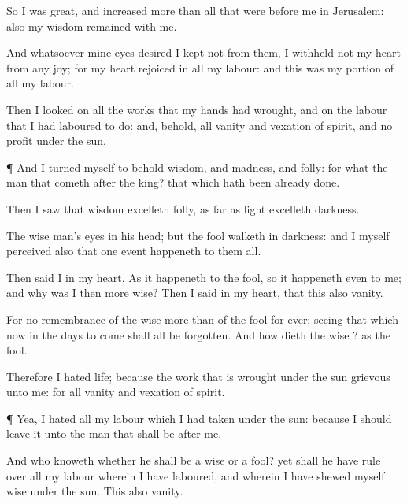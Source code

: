 {So I was
great, and
increased more than all that were
before me in
Jerusalem: also my
wisdom
remained with me.

And whatsoever mine
eyes
desired I
kept not from them, I
withheld not my
heart from any
joy; for my
heart
rejoiced in all my
labour: and this was my
portion of all my
labour.

Then I
looked on all the
works that my
hands had
wrought, and on the
labour that I had
laboured to
do: and, behold, all
{}
vanity and
vexation of
spirit, and
{} no
profit under the
sun.


\par }{\PP {}¶ And I
turned myself to
behold
wisdom, and
madness, and
folly: for what
{} the
man
{} that
cometh
after the
king?
{} that which hath been
already
done.

Then I
saw
that
wisdom
excelleth
folly, as far as
light
excelleth
darkness.

The wise
man’s
eyes
{} in his
head; but the
fool
walketh in
darkness: and I myself
perceived also that
one
event
happeneth to them all.

Then
said I in my
heart, As it
happeneth to the
fool, so it
happeneth even to
me; and why was I then
more
wise? Then I
said in my
heart, that this also
{}
vanity.

For
{} no
remembrance of the
wise more
than of the
fool for
ever; seeing that which
now
{} in the
days to
come shall all be
forgotten. And how
dieth the
wise
{}? as the
fool.


\par }{\PP {}Therefore I
hated
life; because the
work that is
wrought under the
sun
{}
grievous unto me: for all
{}
vanity and
vexation of
spirit.


\par }{\PP {}¶ Yea, I
hated all my
labour which I had
taken under the
sun: because I should
leave it unto the
man that shall be
after me.

And who
knoweth whether he shall be a
wise
{} or a
fool? yet shall he have
rule over all my
labour wherein I have
laboured, and wherein I have shewed myself
wise under the
sun. This
{} also
vanity.

}
